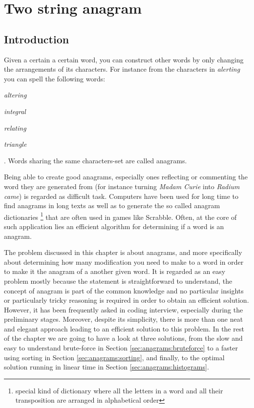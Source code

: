 %


\chapter{Two string anagram}
\label{ch:two_string_anagram}
\section*{Introduction}
Given a certain a certain word, you can construct other words by only changing the arrangements of its characters.
For instance from the characters in \textit{alerting} you can spell the following words:
\begin{enumerate*}
	\item \textit{altering}
	\item \textit{integral}
	\item \textit{relating}
	\item \textit{triangle}
\end{enumerate*}.
Words sharing the same characters-set are called anagrams. 

Being able to create good anagrams,
especially ones reflecting or commenting the word they are generated from (for instance turning
\textit{Madam Curie} into \textit{Radium came}) is regarded as difficult task.
Computers have been used for long time to find anagrams in long texts as well as to generate the so
called anagram dictionaries \footnote{special kind of dictionary where all the letters in a word and
all their transposition are arranged in alphabetical order} that are often used in games like
Scrabble. Often, at the core of such application lies an efficient algorithm for determining if a word is an anagram.

The problem discussed in this chapter is about anagrams, and more specifically about determining how many 
modification you need to make to a word in order to make it the anagram of a
another given word. It is regarded as an easy problem mostly because the statement is straightforward to
understand, the concept of anagram is part of the common knowledge and no particular insights or particularly
tricky reasoning is required in order to obtain an efficient solution. 
However, it has been frequently asked in coding interview, especially during the preliminary stages.
Moreover, despite its simplicity, there is more than one neat and elegant approach leading to an efficient
solution to this problem.
In the rest of the chapter we are going to have a look at three
solutions, from the slow and easy to understand brute-force in Section \ref{sec:anagrams:bruteforce} to a faster using
sorting in Section \ref{sec:anagrams:sorting}, and finally, to the optimal solution running in linear time in Section
\ref{sec:anagrams:histograms}. 

